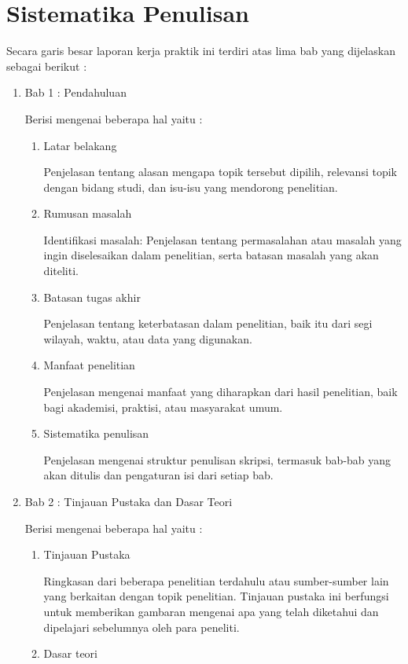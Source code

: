 \section{Sistematika Penulisan}

Secara garis besar laporan kerja praktik ini terdiri atas lima bab yang dijelaskan sebagai berikut :

\begin{enumerate}
	\item Bab 1 : Pendahuluan
	
	Berisi mengenai beberapa hal yaitu :
	\begin{enumerate}[label=\alph*.]
		
		\item Latar belakang
		
		Penjelasan tentang alasan mengapa topik tersebut dipilih, relevansi topik dengan bidang studi, dan isu-isu yang mendorong penelitian.
		\item Rumusan masalah
		
		Identifikasi masalah: Penjelasan tentang permasalahan atau masalah yang ingin diselesaikan dalam penelitian, serta batasan masalah yang akan diteliti.
		\item Batasan tugas akhir

		Penjelasan tentang keterbatasan dalam penelitian, baik itu dari segi wilayah, waktu, atau data yang digunakan.
		\item Manfaat penelitian
		
		Penjelasan mengenai manfaat yang diharapkan dari hasil penelitian, baik bagi akademisi, praktisi, atau masyarakat umum.
		\item Sistematika penulisan
		
		Penjelasan mengenai struktur penulisan skripsi, termasuk bab-bab yang akan ditulis dan pengaturan isi dari setiap bab.
		\end{enumerate}
		\item Bab 2 : Tinjauan Pustaka dan Dasar Teori

		Berisi mengenai beberapa hal yaitu :
		\begin{enumerate}[label=\alph*.]
			\item Tinjauan Pustaka
			
			Ringkasan dari beberapa penelitian terdahulu atau sumber-sumber lain yang berkaitan dengan topik penelitian. Tinjauan pustaka ini berfungsi untuk memberikan gambaran mengenai apa yang telah diketahui dan dipelajari sebelumnya oleh para peneliti.
			\item Dasar teori
			

\end{enumerate}
\end{enumerate}
